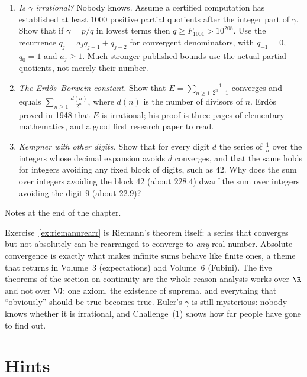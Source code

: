 \begin{challenge}
\begin{enumerate}[label=(\arabic*)]
\item \emph{Is $\gamma$ irrational?} Nobody knows. Assume a certified computation has established at least $1000$ positive partial quotients after the integer part of $\gamma$. Show that if $\gamma=p/q$ in lowest terms then $q\ge F_{1001}>10^{208}$. Use the recurrence $q_j=a_jq_{j-1}+q_{j-2}$ for convergent denominators, with $q_{-1}=0$, $q_0=1$ and $a_j\ge1$. Much stronger published bounds use the actual partial quotients, not merely their number.
\item \emph{The Erd\H{o}s--Borwein constant.} Show that $E=\sum_{n\ge1}\frac1{2^n-1}$ converges and equals $\sum_{n\ge1}\frac{d(n)}{2^n}$, where $d(n)$ is the number of divisors of $n$. Erd\H{o}s proved in 1948 that $E$ is irrational; his proof is three pages of elementary mathematics, and a good first research paper to read.
\item \emph{Kempner with other digits.} Show that for every digit $d$ the series of $\frac1n$ over the integers whose decimal expansion avoids $d$ converges, and that the same holds for integers avoiding any fixed block of digits, such as $42$. Why does the sum over integers avoiding the block $42$ (about $228.4$) dwarf the sum over integers avoiding the digit $9$ (about $22.9$)?
\end{enumerate}
Notes at the end of the chapter.
\end{challenge}

\begin{beauty}
Exercise~\ref{ex:riemannrearr} is Riemann's theorem itself: a series that converges but not absolutely can be rearranged to converge to
\emph{any} real number. Absolute convergence is exactly what makes infinite sums behave like finite ones, a theme that returns in Volume~3
(expectations) and Volume~6 (Fubini). The five theorems of the section on continuity are the whole reason analysis works over $\R$ and not over $\Q$: one
axiom, the existence of suprema, and everything that ``obviously'' should be true becomes true. Euler's $\gamma$ is still mysterious: nobody knows
whether it is irrational, and Challenge~(1) shows how far people have gone to find out.
\end{beauty}

\section{Hints}

